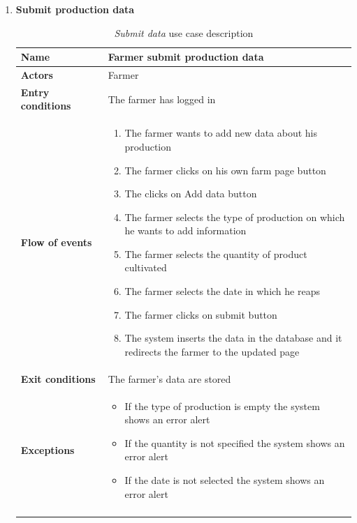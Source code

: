 \begin{enumerate}
    \item \textbf{Submit production data}
        \begin{longtable}{p{0.26\linewidth}p{0.75\linewidth}}
            \toprule
            \textbf{Name} & \textbf{Farmer submit production data} \\
            \midrule
            \textbf{Actors} & Farmer \\
            \midrule
            \textbf{Entry conditions} & The farmer has logged in\\
            \midrule
            \textbf{Flow of events} & 
            \begin{enumerate}
                \item The farmer wants to add new data about his production
                \item The farmer clicks on his own farm page button
                \item The clicks on Add data button
                \item The farmer selects the type of production on which he wants to add information
                \item The farmer selects the quantity of product cultivated
                \item The farmer selects the date in which he reaps 
                \item The farmer clicks on submit button
                \item The system inserts the data in the database and it redirects the farmer to the updated page
            \end{enumerate} \\
            \midrule
            \textbf{Exit conditions} & The farmer's data are stored\\
            \midrule
            \textbf{Exceptions} & 
            \begin{itemize}
                \item If the type of production is empty the system shows an error alert
                \item If the quantity is not specified the system shows an error alert
                \item If the date is not selected the system shows an error alert
            \end{itemize} \\
            \bottomrule
            \caption{\emph{Submit data} use case description}
        \end{longtable}


\end{enumerate}
